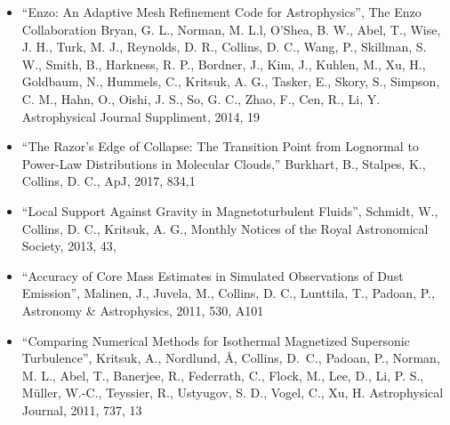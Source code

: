 \documentclass[11pt]{article}
\begin{document}
\begin{itemize}

  \item ``Enzo: An Adaptive Mesh Refinement Code for Astrophysics'', The Enzo
Collaboration 
Bryan, G. L., Norman, M. L.l, O’Shea, B. W.,  Abel, T.,  Wise, J. H.,
Turk, M. J., 
Reynolds, D. R.,
Collins, D. C.,
Wang, P., Skillman, S. W., Smith, B., Harkness, R. P., Bordner, J.,
Kim, J., Kuhlen, M., Xu, H.,
Goldbaum, N., Hummels, C., Kritsuk, A. G., Tasker, E., 
Skory, S., Simpson, C. M., Hahn, O., Oishi, J. S., So, G. C.,
Zhao, F., Cen, R., Li, Y.
Astrophysical Journal Suppliment, 2014,  19

\item ``The Razor’s Edge of Collapse: The Transition Point from Lognormal to Power-Law Distributions in Molecular Clouds,'' 
Burkhart, B., Stalpes, K., Collins, D. C.,
ApJ, 2017, 834,1

\item
``Local Support Against Gravity in Magnetoturbulent Fluids'',
Schmidt, W., Collins, D. C., Kritsuk, A. G.,
Monthly Notices of the Royal Astronomical Society, 2013, 43, 

\item
``Accuracy of Core Mass Estimates in Simulated Observations of Dust Emission'', 
Malinen, J., Juvela, M., Collins, D. C., Lunttila, T., Padoan, P.,
Astronomy \& Astrophysics, 2011, 530, A101

\item
``Comparing Numerical
Methods for Isothermal Magnetized Supersonic Turbulence'', 
Kritsuk, A., Nordlund, \AA, Collins, D.~C., 
Padoan, P., Norman, M. L., Abel, T., Banerjee, R., Federrath, C., Flock, M.,
Lee, D., Li, P. S., M\"uller, W.-C., Teyssier, R., Ustyugov, S. D., Vogel, C.,
Xu, H.
Astrophysical Journal, 2011, 737, 13

\end{itemize}



%

%
\end{document}
